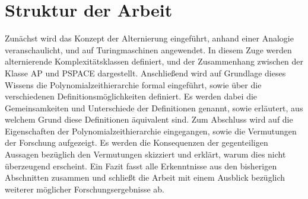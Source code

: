 \section{Struktur der Arbeit}
Zunächst wird das Konzept der Alternierung eingeführt, anhand einer Analogie veranschaulicht, und auf Turingmaschinen angewendet. In diesem Zuge werden alternierende Komplexitätsklassen definiert, und der Zusammenhang 
zwischen der Klasse AP und PSPACE dargestellt. Anschließend wird auf Grundlage dieses Wissens die Polynomialzeithierarchie formal eingeführt, sowie über die verschiedenen Definitionsmöglichkeiten definiert.
Es werden dabei die Gemeinsamkeiten und Unterschiede der Definitionen genannt, sowie erläutert, aus welchem Grund diese Definitionen äquivalent sind.
Zum Abschluss wird auf die Eigenschaften der Polynomialzeithierarchie eingegangen, sowie die Vermutungen der Forschung aufgezeigt. 
Es werden die Konsequenzen der gegenteiligen Aussagen bezüglich den Vermutungen skizziert und erklärt, warum dies nicht überzeugend erscheint.
Ein Fazit fasst alle Erkenntnisse aus den bisherigen Abschnitten zusammen und schließt die Arbeit mit einem Ausblick bezüglich weiterer möglicher Forschungsergebnisse ab.






